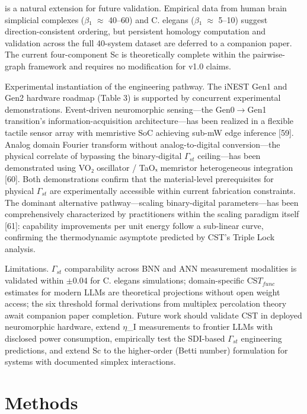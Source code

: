 \documentclass[a4paper,12pt]{article}
\begin{document}
is a natural extension for future validation. Empirical data from human brain simplicial complexes ($\beta$₁ $\approx$ 40--60) and C. elegans ($\beta$₁ $\approx$ 5--10) suggest direction-consistent ordering, but persistent homology computation and validation across the full 40-system dataset are deferred to a companion paper. The current four-component Sc is theoretically complete within the pairwise-graph framework and requires no modification for v1.0 claims.


Experimental instantiation of the engineering pathway. The iNEST Gen1 and Gen2 hardware roadmap (Table 3) is supported by concurrent experimental demonstrations. Event-driven neuromorphic sensing---the Gen0$\rightarrow$Gen1 transition's information-acquisition architecture---has been realized in a flexible tactile sensor array with memristive SoC achieving sub-mW edge inference [59]. Analog domain Fourier transform without analog-to-digital conversion---the physical correlate of bypassing the binary-digital $\Gamma_{st}$ ceiling---has been demonstrated using VO₂ oscillator / TaOₓ memristor heterogeneous integration [60]. Both demonstrations confirm that the material-level prerequisites for physical $\Gamma_{st}$ are experimentally accessible within current fabrication constraints. The dominant alternative pathway---scaling binary-digital parameters---has been comprehensively characterized by practitioners within the scaling paradigm itself [61]: capability improvements per unit energy follow a sub-linear curve, confirming the thermodynamic asymptote predicted by CST's Triple Lock analysis.


Limitations. $\Gamma_{st}$ comparability across BNN and ANN measurement modalities is validated within $\pm$0.04 for C. elegans simulations; domain-specific CS$T_{func}$ estimates for modern LLMs are theoretical projections without open weight access; the six threshold formal derivations from multiplex percolation theory await companion paper completion. Future work should validate CST in deployed neuromorphic hardware, extend $\eta$_I measurements to frontier LLMs with disclosed power consumption, empirically test the SDI-based $\Gamma_{st}$ engineering predictions, and extend Sc to the higher-order (Betti number) formulation for systems with documented simplex interactions.



\section{Methods}
\end{document}
